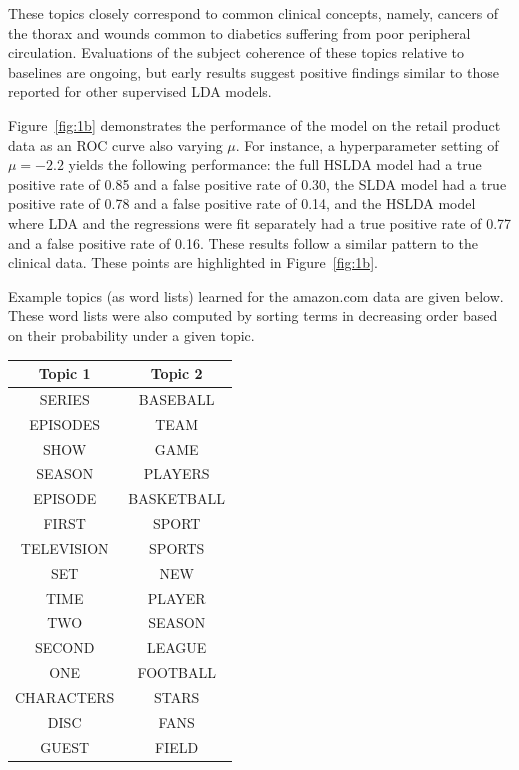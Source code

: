These topics closely correspond to common clinical concepts, namely, cancers of the thorax and wounds common to diabetics suffering from poor peripheral circulation.  Evaluations of the subject coherence of these topics relative to baselines are ongoing, but early results suggest positive findings similar to those reported for other supervised LDA models.

Figure~\ref{fig:1b} demonstrates the performance of the model on the retail product data as an ROC curve also varying $\mu$. For
instance, a hyperparameter setting of $\mu=-2.2$ yields the following
performance: the full HSLDA model had a true positive rate of 0.85 
and a false positive rate of 0.30, the SLDA model had a true positive
rate of 0.78 and a false positive rate of 0.14, and the HSLDA model where
LDA and the regressions were fit separately had a true positive rate of 0.77
and a false positive rate of 0.16. These results follow a similar pattern to the clinical data. These points are highlighted in Figure~\ref{fig:1b}.

Example topics (as word lists) learned for the amazon.com data are given below.  These word lists were also computed by sorting
terms in decreasing order based on their probability under a given topic.

\begin{extract}
\begin{tabular}{|c|c|}
\hline
\textbf{Topic 1} & \textbf{Topic 2} \\ \hline \hline
SERIES & BASEBALL \\
\hline
EPISODES & TEAM \\
\hline
SHOW & GAME \\
\hline
SEASON & PLAYERS \\
\hline
EPISODE & BASKETBALL \\
\hline
FIRST & SPORT \\
\hline
TELEVISION & SPORTS \\
\hline
SET & NEW \\
\hline
TIME & PLAYER \\
\hline
TWO & SEASON \\
\hline
SECOND & LEAGUE \\
\hline
ONE & FOOTBALL \\
\hline
CHARACTERS & STARS \\
\hline
DISC & FANS \\
\hline
GUEST & FIELD \\
\hline
\end{tabular}
\end{extract}

